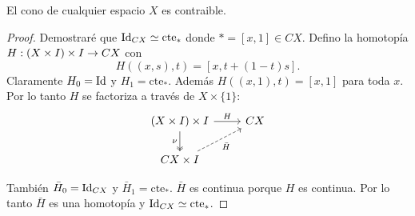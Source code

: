 \begin{ejercicio}\label{ej:36}
  El cono de cualquier espacio $X$ es contraible.
\end{ejercicio}
\begin{proof}%
  Demostrar\'e que $\text{Id}_{CX}\simeq \text{cte}_*$ donde $*=[x,1]\in CX$. Defino la homotop\'ia
  $H:(X\times I)\times I\rightarrow CX$ con
  \[
    H((x,s),t)=[x,t+(1-t)s].
  \]
  Claramente $H_0=\text{Id}$ y $H_1=\text{cte}_*$. Adem\'as $H((x,1),t)=[x,1]$ para toda $x$. Por lo tanto
  $H$ se factoriza a trav\'es de $X\times\{1\}$:
  \[
    \begin{tikzcd}
      (X\times I)\times I \arrow[r,"H"] \arrow[d,two heads,"\nu"'] & CX \\
      CX\times I \arrow[ur,dashed,"\bar{H}"'] &
    \end{tikzcd}
  \]

  Tambi\'en $\bar{H}_0=\text{Id}_{CX}$ y $\bar{H}_1=\text{cte}_*$. $\bar{H}$ es continua porque $H$ es
  continua. Por lo tanto $\bar{H}$ es una homotop\'ia y $\text{Id}_{CX}\simeq\text{cte}_*$.
\end{proof}%

